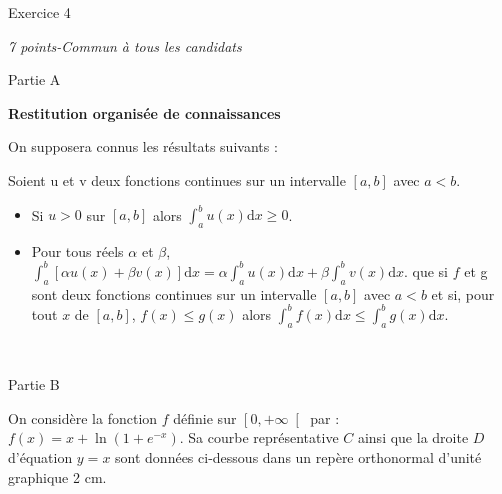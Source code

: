 
%
\begin{h2}Exercice 4\end{h2}
\textit{7 points-Commun à tous les candidats}
\begin{h3}Partie A\end{h3}
\textbf{Restitution organisée de connaissances}
\par
On supposera connus les résultats suivants :
\par
Soient u et v deux fonctions continues sur un intervalle $\left[a, b\right]$ avec $a < b$.

\begin{itemize}
\item
Si $u > 0$ sur $\left[a, b\right]$ alors $\int_{a}^{b} u\left(x\right)\text{d}x \geqslant 0$.
\item
Pour tous réels $\alpha $ et $\beta $, $\int_{a}^{b} \left[\alpha  u\left(x\right)+\beta  v\left(x\right)\right] \text{d}x=\alpha   \int_{a}^{b} u\left(x\right) \text{d}x+\beta   \int_{a}^{b} v\left(x\right) \text{d}x.$
 que si $f$ et g sont deux fonctions continues sur un intervalle $\left[a, b\right]$ avec $a < b$ et si, pour tout $x$ de $\left[a, b\right]$, $f\left(x\right) \leqslant g\left(x\right)$ alors $\int_{a}^{b} f\left(x\right) \text{d}x \leqslant  \int_{a}^{b} g\left(x\right) \text{d}x$.
\end{itemize}
\\
\begin{h3}Partie B\end{h3}
On considère la fonction $f$ définie sur $\left[0, +\infty \right[$ par : $f\left(x\right)=x+\ln\left(1+e^{-x}\right)$. Sa courbe représentative $C$ ainsi que la droite $D$ d'équation $y=x$ sont données ci-dessous dans un repère orthonormal d'unité graphique 2 cm.

